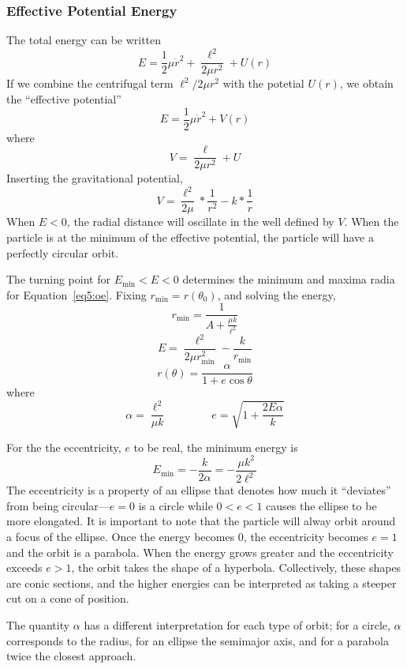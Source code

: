 \subsubsection{Effective Potential Energy}
The total energy can be written
\[E = \frac{1}{2}\mu\dot r^2 + \frac{\ell^2}{2\mu r^2} + U(r)\]
If we combine the centrifugal term \(\ell^2/2\mu r^2\) with the potetial \(U(r)\), we obtain the ``effective potential''
\[E=\frac{1}{2}\mu\dot r^2 +  V(r)\]
where
\begin{equation}
	V = \frac{\ell}{2\mu r^2}+U
\end{equation}
Inserting the gravitational potential,
\[V = \frac{\ell^2}{2\mu}*\frac{1}{r^2}-k*\frac{1}{r}\]
When \(E<0\), the radial distance will oscillate in the well defined by \(V\). When the particle is at the minimum of the effective potential, the particle will have a perfectly circular orbit.

The turning point for \(E_{\min}<E<0\) determines the minimum and maxima radia for Equation~\ref{eq5:oe}. Fixing \(r_{\min}=r(\theta_0)\), and solving the energy,
\[r_{\min} = \frac{1}{A+\frac{\mu k}{\ell^2}}\]
\[E=\frac{\ell^2}{2\mu r_{\min}^2}-\frac{k}{r_{\min}}\]
\begin{equation}
	r(\theta) = \frac{\alpha}{1+e\cos\theta}
\end{equation}
where
\[\alpha = \frac{\ell^2}{\mu k} \qquad\qquad e = \sqrt{1+\frac{2E\alpha}{k}}\]

For the the eccentricity, \(e\) to be real, the minimum energy is
\[E_{\min}=-\frac{k}{2\alpha} = -\frac{\mu k^2}{2\ell^2}\]
The eccentricity is a property of an ellipse that denotes how much it ``deviates'' from being circular---\(e=0\) is a circle while \(0<e<1\) causes the ellipse to be more elongated. It is important to note that the particle will alway orbit around a focus of the ellipse. Once the energy becomes \(0\), the eccentricity becomes \(e=1\) and the orbit is a parabola. When the energy grows greater and the eccentricity exceeds \(e>1\), the orbit takes the shape of a hyperbola. Collectively, these shapes are conic sections, and the higher energies can be interpreted as taking a steeper cut on a cone of position.

The quantity \(\alpha\) has a different interpretation for each type of orbit; for a circle, \(\alpha\) corresponds to the radius, for an ellipse the semimajor axis, and for a parabola twice the closest approach.

